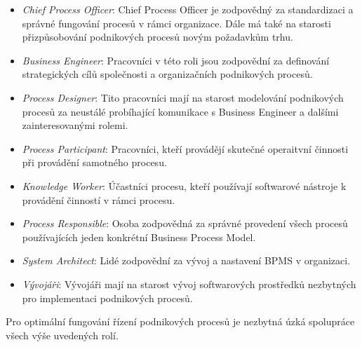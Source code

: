 \documentclass[]{article}
\begin{document}
\begin{itemize}
\item \textit{Chief Process Officer}: Chief Process Officer je zodpovědný za standardizaci a správné fungování procesů v rámci organizace. Dále má také na starosti přizpůsobování podnikových procesů novým požadavkům trhu.
\item \textit{Business Engineer}: Pracovníci v této roli jsou zodpovědní za definování strategických cílů společnosti a organizačních podnikových procesů.
\item \textit{Process Designer}: Tito pracovníci mají na starost modelování podnikových procesů za neustálé probíhající komunikace s Business Engineer a dalšími zainteresovanými rolemi.
\item \textit{Process Participant}: Pracovníci, kteří provádějí skutečné operaitvní činnosti při provádění samotného procesu.
\item \textit{Knowledge Worker}: Účastníci procesu, kteří používají softwarové nástroje k provádění činností v rámci procesu.
\item \textit{Process Responsible}: Osoba zodpovědná za správné provedení všech procesů používajících jeden konkrétní Business Process Model.
\item \textit{System Architect}: Lidé zodpovědní za vývoj a nastavení BPMS v organizaci.
\item \textit{Vývojáři}: Vývojáři mají na starost vývoj softwarových prostředků nezbytných pro implementaci podnikových procesů.
\end{itemize}

Pro optimální fungování řízení podnikových procesů je nezbytná úzká spolupráce všech výše uvedených rolí.

\nocite{*}


\end{document}
